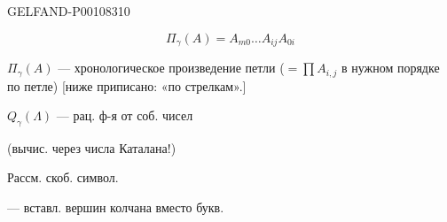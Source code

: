 \begin{GelfandAdjacentEvidence}{GELFAND-P001083}{10}


\[
\Pi_\gamma(A)=A_{m0}\ldots A_{ij}A_{0i}
\]

$\Pi_\gamma(A)$ — хронологическое произведение петли
($=\prod A_{i,j}$ в нужном порядке по петле)
[ниже приписано: «по стрелкам».]
\end{GelfandAdjacentEvidence}


$Q_\gamma(\Lambda)$ — рац. ф-я от соб. чисел

(вычис. через числа Каталана!)

Рассм. скоб. символ.

 — вставл. вершин колчана вместо букв.


